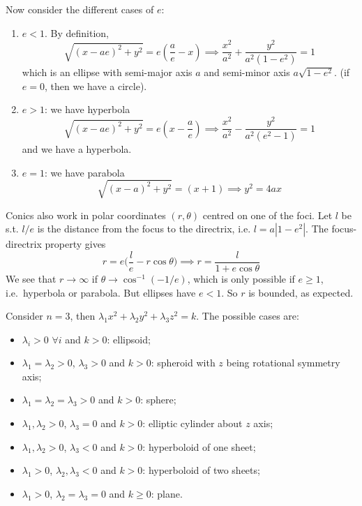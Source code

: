 \documentclass[a4paper]{article}
\begin{document}
Now consider the different cases of $e$:
\begin{enumerate}
  \item $e < 1$. By definition,
$$\sqrt{(x - ae)^2 + y^2}= e\left(\frac{a}{e} - x\right)\implies       \frac{x^2}{a^2} + \frac{y^2}{a^2(1 - e^2)} = 1$$
which is an ellipse with semi-major axis $a$ and semi-minor axis $a\sqrt{1 - e^2}$. (if $e = 0$, then we have a circle).
  \item $e > 1$: we have hyperbola
$$\sqrt{(x - ae)^2 + y^2}= e\left(x - \frac{a}{e}\right)\implies\frac{x^2}{a^2} - \frac{y^2}{a^2(e^2 - 1)}= 1$$
    and we have a hyperbola.
  \item $e = 1$: we have parabola
$$\sqrt{(x - a)^2 + y^2} = (x + 1)\implies     y^2 = 4ax$$
\end{enumerate}
Conics also work in polar coordinates $(r,\theta)$ centred on one of the foci. Let $l$ be s.t. $l/e$ is the distance from the focus to the directrix, i.e. $l = a|1 - e^2|$. The focus-directrix property gives
$$r=e\bigg(\frac{l}{e}-r\cos\theta\bigg)\implies r=\frac{l}{1+e\cos\theta}$$
We see that $r\rightarrow \infty$ if $\theta \rightarrow \cos^{-1}(-1/e)$, which is only possible if $e\geq 1$, i.e.\ hyperbola or parabola. But ellipses have $e < 1$. So $r$ is bounded, as expected.
\begin{eg}
Consider $n=3$, then $\lambda_1x^2+\lambda_2y^2+\lambda_3z^2=k$. The possible cases are:
\begin{itemize}
    \item $\lambda_i>0$ $\forall i$ and $k>0$: ellipsoid;
    \item $\lambda_1=\lambda_2>0$, $\lambda_3>0$ and $k>0$: spheroid with $z$ being rotational symmetry axis;
    \item $\lambda_1=\lambda_2=\lambda_3>0$ and $k>0$: sphere;
    \item $\lambda_1,\lambda_2>0$, $\lambda_3=0$ and $k>0$: elliptic cylinder about $z$ axis;
    \item $\lambda_1,\lambda_2>0$, $\lambda_3<0$ and $k>0$: hyperboloid of one sheet;
    \item $\lambda_1>0$, $\lambda_2,\lambda_3<0$ and $k>0$: hyperboloid of two sheets;
    \item $\lambda_1>0$, $\lambda_2=\lambda_3=0$ and $k\geq 0$: plane.
\end{itemize}
\end{eg}
\newpage
\end{document}
